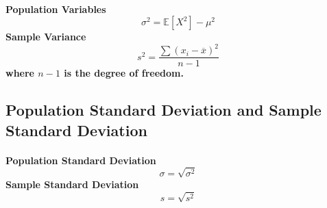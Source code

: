 \documentclass[titlepage]{article}
\begin{document}
        \paragraph{
            Population Variables
            $$\sigma^2=\mathbb{E}[X^2]-\mu^2$$
            Sample Variance
            $$s^2=\frac{\sum (x_i-\overline{x})^2}{n-1}$$ where $n-1$ is the degree of freedom.
        }
        \subsection*{Population Standard Deviation and Sample Standard Deviation}
            \paragraph{
                Population Standard Deviation
                $$\sigma=\sqrt{\sigma^2}$$
                Sample Standard Deviation
                $$s=\sqrt{s^2}$$
            }
    
\end{document}
